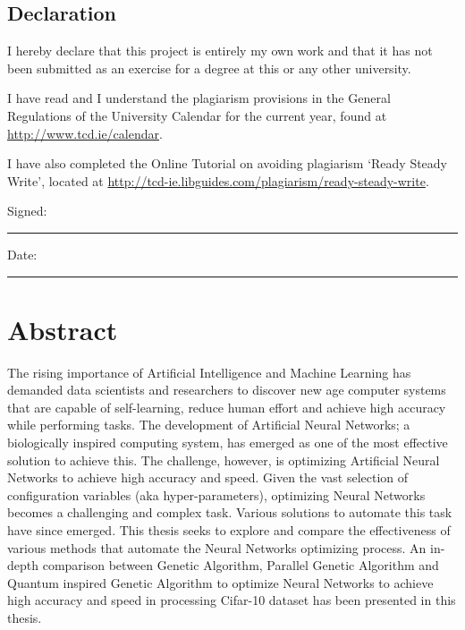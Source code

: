 \documentclass[a4paper,oneside,12pt]{book}
\title{\thesistitle}
\author{\authorname}
\begin{document}

\section*{\Huge{Declaration}}
\vspace{1cm}
I hereby declare that this project is entirely my own work and that it has not been submitted as an exercise for a degree at this or any other university.

\vspace{1cm}
I have read and I understand the plagiarism provisions in the General Regulations of the University Calendar for the current year, found at \url{http://www.tcd.ie/calendar}.
\vspace{1cm}

I have also completed the Online Tutorial on avoiding plagiarism `Ready Steady Write', located at
\url{http://tcd-ie.libguides.com/plagiarism/ready-steady-write}.
\vspace{3cm}

Signed:~\rule{5cm}{0.3pt}\hfill Date:~\rule{5cm}{0.3pt}

\chapter*{Abstract}
The rising importance of Artificial Intelligence and Machine Learning has demanded data scientists and researchers to discover new age computer systems that are capable of self-learning, reduce human effort and achieve high accuracy while performing tasks. The development of Artificial Neural Networks; a biologically inspired computing system, has emerged as one of the most effective solution to achieve this. The challenge, however, is optimizing Artificial Neural Networks to achieve high accuracy and speed. Given the vast selection of configuration variables (aka hyper-parameters), optimizing Neural Networks becomes a challenging and complex task. Various solutions to automate this task have since emerged. This thesis seeks to explore and compare the effectiveness of various methods that automate the Neural Networks optimizing process. An in-depth comparison between Genetic Algorithm, Parallel Genetic Algorithm and Quantum inspired Genetic Algorithm to optimize Neural Networks to achieve high accuracy and speed in processing Cifar-10 dataset has been presented in this thesis.


\newpage
\onehalfspacing\raggedright %
\end{document}

